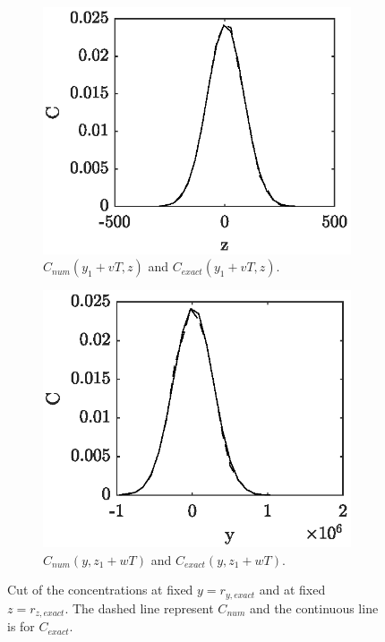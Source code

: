 \begin{figure}[H]
	\centering
	\begin{subfigure}[b]{0.49\textwidth}
		\includegraphics[width=\textwidth]{fig/testcase/testcase_fixedy.eps}
		\caption{$C_{num}(y_1+vT,z)$ and $C_{exact}(y_1+vT,z)$.}
		\label{fig:testcase_fixedy}
	\end{subfigure}
	\begin{subfigure}[b]{0.49\textwidth}
		\includegraphics[width=\textwidth]{fig/testcase/testcase_fixedz.eps}
		\caption{$C_{num}(y,z_1+wT)$ and $C_{exact}(y,z_1+wT)$.}
		\label{fig:testcase_fixedz}
	\end{subfigure}
	\caption{Cut of the concentrations at fixed $y = r_{y,exact}$ and at fixed $z = r_{z,exact}$. The dashed line represent $C_{num}$ and the continuous line is for $C_{exact}$.}
\end{figure}


